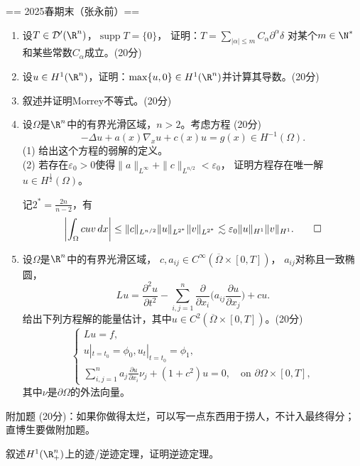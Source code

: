 == 2025春期末（张永前）==
\begin{enumerate}
    \item 设$T\in\mathcal{D}'(\R^n)$，$\operatorname{supp}T=\{0\}$，
    证明：$T=\sum\limits_{|\alpha| \le m}C_\alpha\partial^\alpha\delta$
    对某个$m\in\N^*$和某些常数$C_\alpha$成立。(20分)
    \item 设$u \in H^1(\R^n)$，证明：$\max\{u,0\} \in H^1(\R^n)$并计算其导数。(20分)
    \item 叙述并证明Morrey不等式。(20分)
    \item 设$\Omega$是$\R^n$中的有界光滑区域，$n>2$。考虑方程 (20分)
    \[-\Delta u+a(x)\nabla_xu+c(x)u=g(x) \in H^{-1}(\Omega).\]
    (1) 给出这个方程的弱解的定义。\\
    (2) 若存在$\varepsilon_0>0$使得$\|a\|_{L^\infty}+\|c\|_{L^{n/2}}<\varepsilon_0$，
    证明方程存在唯一解$u \in H^\frac{1}{2}(\Omega)$。
    \begin{proofc}[提示]
        记$2^*=\frac{2n}{n-2}$，有
        \[\left|\int_\Omega cuv\,dx\right|\le\|c\|_{L^{n/2}}\|u\|_{L^{2^*}}\|v\|_{L^{2^*}}
        \lesssim\varepsilon_0\|u\|_{H^1}\|v\|_{H^1}.\qedhere\]
    \end{proofc}
    \item 设$\Omega$是$\R^n$中的有界光滑区域，
    $c,a_{ij} \in C^\infty(\overline{\Omega}\times[0,T])$，
    $a_{ij}$对称且一致椭圆，
    \[Lu=\frac{\partial^2u}{\partial t^2}-\sum_{i,j=1}^n\frac{\partial}{\partial x_i}
    \bigg(a_{ij}\frac{\partial u}{\partial x_j}\bigg)+cu.\]
    给出下列方程解的能量估计，其中$u \in C^2(\overline{\Omega}\times[0,T])$。(20分)
    \[\begin{cases}
        Lu=f,\\u|_{t=t_0}=\phi_0,u_t|_{t=t_0}=\phi_1,\\
        \displaystyle\sum_{i,j=1}^na_j\frac{\partial u}{\partial x_i}\nu_j+(1+c^2)u=0,
        \quad\text{on }\partial\Omega\times[0,T],
    \end{cases}\]
    其中$\nu$是$\partial\Omega$的外法向量。
\end{enumerate}
附加题 (20分)：如果你做得太烂，可以写一点东西用于捞人，不计入最终得分；直博生要做附加题。

叙述$H^1(\R^n_+)$上的迹/逆迹定理，证明逆迹定理。

